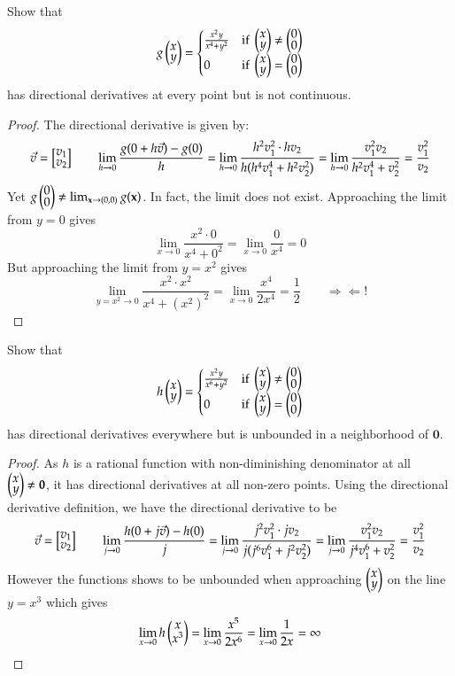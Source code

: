Show that
\[g\Point{x \\ y} = \begin{cases}
 \frac{x^2y}{x^4+y^2} & \text{if } \def\arraystretch{0.7}\Point{x \\ y} \neq \Point{0 \\ 0} \\
0 & \text{if } \def\arraystretch{0.7}\Point{x \\ y} = \Point{0 \\ 0}
\end{cases}\]
has directional derivatives at every point but is not continuous.

\begin{proof}
  The directional derivative is given by: 
  \[\vec{v}=\mtrx{v_1 \\ v_2}\qquad \lim_{h\to 0}\frac{g(0+h\vec{v})-g(0)}{h}=\lim_{h\to 0} \frac{h^2v_1^2\cdot hv_2}{h(h^4v_1^4 + h^2 v_2^2)}=\lim_{h\to 0} \frac{v_1^2 v_2}{h^2v_1^4 + v_2^2}=\frac{v_1^2}{v_2}\]
  Yet $g\Point{0 \\ 0}\neq \lim_{\bm{x}\to (0,0)}g(\bm{x})$. In fact, the limit does not exist. Approaching the limit from $y=0$ gives
  \[\lim_{x\to 0}\frac{x^2\cdot 0}{x^4+0^2}=\lim_{x\to 0}\frac{0}{x^4}=0\]
  But approaching the limit from $y=x^2$ gives
  \[\lim_{y = x^2\to 0}\frac{x^2\cdot x^2}{x^4+(x^2)^2}=\lim_{x\to 0}\frac{x^4}{2x^4  }=\frac{1}{2} \qquad \Rightarrow\!\Leftarrow!\]
  
\end{proof}

Show that
\[h\Point{x \\ y} = \begin{cases} \frac{x^2 y}{x^6+y^2} & \text{if } \def\arraystretch{0.7}\Point{x \\ y} \neq \Point{0 \\ 0} \\
0 & \text{if } \def\arraystretch{0.7}\Point{x \\ y} = \Point{0 \\ 0}
\end{cases}\]
has directional derivatives everywhere but is unbounded in a neighborhood of $\bm{0}$. 

\begin{proof}
	As $h$ is a rational function with non-diminishing denominator at all $\Point{x \\ y}\neq \bm{0}$, it has directional derivatives at all non-zero points. Using the directional derivative definition, we have the directional derivative to be
  \[\vec{v}=\mtrx{v_1 \\ v_2}\qquad \lim_{j\to 0}\frac{h(0+j\vec{v})-h(0)}{j}=\lim_{j\to 0} \frac{j^2v_1^2\cdot jv_2}{j(j^6v_1^6 + j^2 v_2^2)}=\lim_{j\to 0} \frac{v_1^2 v_2}{j^4v_1^6 + v_2^2}=\frac{v_1^2}{v_2}\]
  However the functions shows to be unbounded when approaching $\Point{x \\ y}$ on the line $y=x^3$ which gives
  \[\lim_{x\to 0}h\Point{x \\ x^3}=\lim_{x\to 0}\frac{x^5}{2x^6}=\lim_{x\to 0}\frac{1}{2x}=\infty\]
\end{proof}

